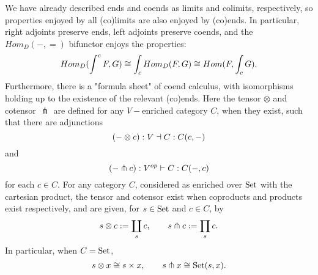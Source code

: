 We have already described ends and coends as limits and colimits, respectively, so properties enjoyed by all (co)limits are also enjoyed by (co)ends. In particular, right adjoints preserve ends, left adjoints preserve coends, and the $Hom_D(-,=)$ bifunctor enjoys the properties:
$$Hom_D(\int^cF,G)\cong \int_cHom_D(F,G)\cong Hom(F,\int_cG).$$
Furthermore, there is a "formula sheet" of coend calculus, with isomorphisms holding up to the existence of the relevant (co)ends. Here the tensor $\otimes$ and cotensor $\pitchfork$ are defined for any $V-$enriched category $C$, when they exist, such that there are adjunctions
$$(-\otimes c):V\dashv C:C(c,-)$$
and
$$(-\pitchfork c):V^{op}\vdash C:C(-,c)$$
for each $c\in C$. For any category $C$, considered as enriched over ${\text{Set}}$ with the cartesian product, the tensor and cotensor exist when coproducts and products exist respectively, and are given, for $s\in {\text{Set}}$ and $c\in C$, by
$$s\otimes c:= \coprod_{s}c,\qquad s\pitchfork c:= \prod_{s}c.$$
In particular, when $C={\text{Set}}$, $$s\otimes x\cong s\times x, \qquad s\pitchfork x\cong {\text{Set}}(s,x).$$\newline\setlength{\fboxsep}{5pt}
\begin{figure}[ht]
    \centering
{}\label{table:coends}
\end{figure}


